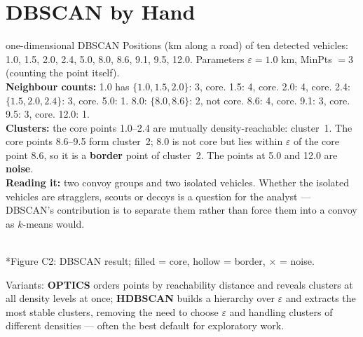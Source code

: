 \documentclass[11pt]{article}
\begin{document}
\section{DBSCAN by Hand}
\begin{example}{one-dimensional DBSCAN}
Positions (km along a road) of ten detected vehicles: 1.0, 1.5, 2.0, 2.4, 5.0, 8.0, 8.6, 9.1, 9.5, 12.0. Parameters $\varepsilon=1.0$ km, MinPts $=3$ (counting the point itself).\\[2pt]
\textbf{Neighbour counts:} 1.0 has $\{1.0,1.5,2.0\}$: 3, core. 1.5: 4, core. 2.0: 4, core. 2.4: $\{1.5,2.0,2.4\}$: 3, core. 5.0: 1. 8.0: $\{8.0,8.6\}$: 2, not core. 8.6: 4, core. 9.1: 3, core. 9.5: 3, core. 12.0: 1.\\
\textbf{Clusters:} the core points 1.0--2.4 are mutually density-reachable: cluster~1. The core points 8.6--9.5 form cluster~2; 8.0 is not core but lies within $\varepsilon$ of the core point 8.6, so it is a \textbf{border} point of cluster~2. The points at 5.0 and 12.0 are \textbf{noise}.\\
\textbf{Reading it:} two convoy groups and two isolated vehicles. Whether the isolated vehicles are stragglers, scouts or decoys is a question for the analyst --- DBSCAN's contribution is to separate them rather than force them into a convoy as $k$-means would.
\end{example}
\begin{center}\\*{\small\color{GreyN}Figure C2: DBSCAN result; filled = core, hollow = border, $\times$ = noise.}\end{center}

Variants: \textbf{OPTICS} orders points by reachability distance and reveals clusters at all density levels at once; \textbf{HDBSCAN} builds a hierarchy over $\varepsilon$ and extracts the most stable clusters, removing the need to choose $\varepsilon$ and handling clusters of different densities --- often the best default for exploratory work.
\end{document}
